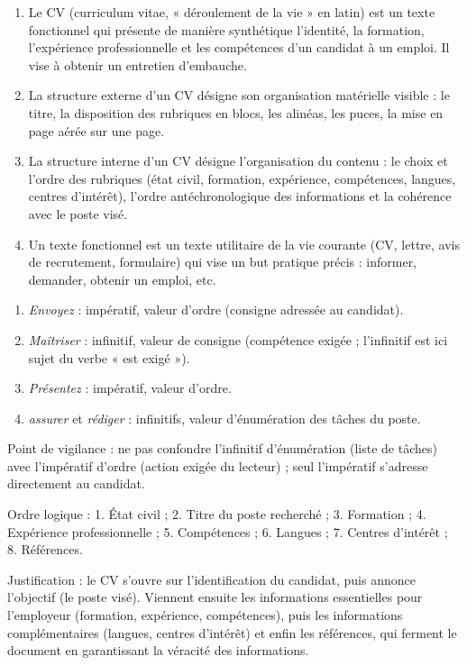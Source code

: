 \documentclass[11pt]{article}
\newcommand{\cle}[1]{{\popxbold\color{popdark}#1}}
\newcounter{popsec}
\newcounter{popsub}
\newcommand{\courssub}[1]{%
  \stepcounter{popsub}%
  \par\vspace{9pt}\noindent{\popxbold\fontsize{11.5}{13}\selectfont\color{popink}{\color{poporange}\thepopsec.\thepopsub}\hspace{6pt}#1}\par\nopagebreak\vspace{4pt}
}
\begin{document}
\begin{corrige}
\begin{enumerate}
\item Le \cle{CV} (curriculum vitae, « déroulement de la vie » en latin) est un texte fonctionnel qui présente de manière synthétique l'identité, la formation, l'expérience professionnelle et les compétences d'un candidat à un emploi. Il vise à obtenir un entretien d'embauche.
\item La \cle{structure externe} d'un CV désigne son organisation matérielle visible : le titre, la disposition des rubriques en blocs, les alinéas, les puces, la mise en page aérée sur une page.
\item La \cle{structure interne} d'un CV désigne l'organisation du contenu : le choix et l'ordre des rubriques (état civil, formation, expérience, compétences, langues, centres d'intérêt), l'ordre antéchronologique des informations et la cohérence avec le poste visé.
\item Un \cle{texte fonctionnel} est un texte utilitaire de la vie courante (CV, lettre, avis de recrutement, formulaire) qui vise un but pratique précis : informer, demander, obtenir un emploi, etc.
\end{enumerate}
\end{corrige}

\begin{corrige}
\begin{enumerate}
\item \emph{Envoyez} : \cle{impératif}, valeur d'ordre (consigne adressée au candidat).
\item \emph{Maîtriser} : \cle{infinitif}, valeur de consigne (compétence exigée ; l'infinitif est ici sujet du verbe « est exigé »).
\item \emph{Présentez} : \cle{impératif}, valeur d'ordre.
\item \emph{assurer} et \emph{rédiger} : \cle{infinitifs}, valeur d'énumération des tâches du poste.
\end{enumerate}
Point de vigilance : ne pas confondre l'infinitif d'énumération (liste de tâches) avec l'impératif d'ordre (action exigée du lecteur) ; seul l'impératif s'adresse directement au candidat.
\end{corrige}

\courssub{Je m'entraîne}

\begin{corrige}
Ordre logique : 1. État civil ; 2. Titre du poste recherché ; 3. Formation ; 4. Expérience professionnelle ; 5. Compétences ; 6. Langues ; 7. Centres d'intérêt ; 8. Références.

Justification : le CV s'ouvre sur l'identification du candidat, puis annonce l'objectif (le poste visé). Viennent ensuite les informations essentielles pour l'employeur (formation, expérience, compétences), puis les informations complémentaires (langues, centres d'intérêt) et enfin les références, qui ferment le document en garantissant la véracité des informations.
\end{corrige}
\end{document}
